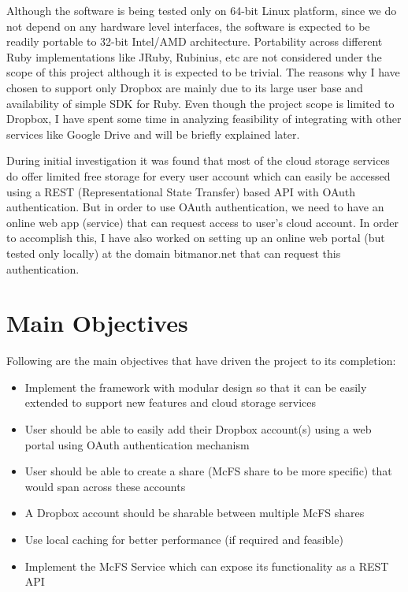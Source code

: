 Although the software is being tested only on 64-bit Linux platform, since we do not depend on any hardware level interfaces, the software is expected to be readily portable to 32-bit Intel/AMD architecture. Portability across different Ruby implementations like JRuby, Rubinius, etc are not considered under the scope of this project although it is expected to be trivial. The reasons why I have chosen to support only Dropbox are mainly due to its large user base and availability of simple SDK for Ruby. Even though the project scope is limited to Dropbox, I have spent some time in analyzing feasibility of integrating with other services like Google Drive and will be briefly explained later. 

During initial investigation it was found that most of the cloud storage services do offer limited free storage for every user account which can easily be accessed using a REST (Representational State Transfer) based API with OAuth authentication. But in order to use OAuth authentication, we need to have an online web app (service) that can request access to user's cloud account. In order to accomplish this, I have also worked on setting up an online web portal (but tested only locally) at the domain bitmanor.net that can request this authentication.

\section{Main Objectives}
Following are the main objectives that have driven the project to its completion:
\begin{itemize}
	\item Implement the framework with modular design so that it can be easily extended to support new features and cloud storage services
	\item User should be able to easily add their Dropbox account(s) using a web portal using OAuth authentication mechanism
	\item User should be able to create a share (McFS share to be more specific) that would span across these accounts
	\item A Dropbox account should be sharable between multiple McFS shares
	\item Use local caching for better performance (if required and feasible)
	\item Implement the McFS Service which can expose its functionality as a REST API
\end{itemize}


